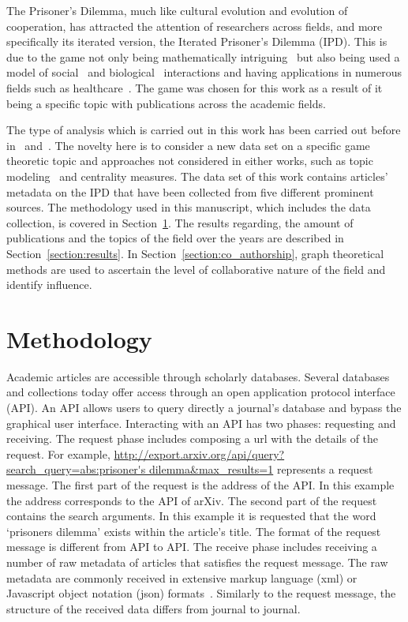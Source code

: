 \documentclass{article}
\theoremstyle{definition}
\newcommand{\totalarticles}{}
\begin{document}
The Prisoner's Dilemma, much like cultural evolution and evolution of cooperation,
has attracted the attention of researchers across fields, and more specifically
its iterated version, the Iterated Prisoner's Dilemma (IPD). This is due to
the game not only being mathematically
intriguing~\cite{Press2012} but also being used a model of
social~\cite{Zimmermann2005} and biological~\cite{Doebeli2005} interactions and
having applications in numerous fields such as healthcare~\cite{Turner1999}. The
game was chosen for this work as a result of it being a specific topic with
publications across the academic fields.

The type of analysis  which is carried out in this work has been carried out
before in~\cite{Liu2015} and~\cite{youngblood2018}. The novelty here is to
consider a new data set on a specific game theoretic topic and approaches not considered in
either works, such as topic modeling~\cite{Blei2003} and centrality measures.
The data set of this work contains \totalarticles
articles' metadata on the IPD that have been collected from five different
prominent sources. The methodology used in this manuscript, which includes the
data collection, is covered in Section~\ref{section:methodology}. The results regarding,
the amount of publications and the topics of the field over the years are
described in Section~\ref{section:results}. In
Section~\ref{section:co_authorship}, graph theoretical methods are used to
ascertain the level of collaborative nature of the field and identify influence.

\section{Methodology}\label{section:methodology}

Academic articles are accessible through scholarly databases. Several databases
and collections today offer access through an open application protocol
interface (API). An API allows users to query directly a journal's database and
bypass the graphical user interface. Interacting with an API has two phases:
requesting and receiving. The request phase includes composing a url with the
details of the request. For example,
\url{http://export.arxiv.org/api/query?search_query=abs:prisoner's
dilemma&max_results=1} represents a request message. The first part of the
request is the address of the API. In this example the address corresponds to
the API of arXiv. The second part of the request contains the search arguments.
In this example it is requested that the word `prisoners dilemma' exists within
the article's title. The format of the request message is different from API to
API. The receive phase includes receiving a number of raw metadata of articles
that satisfies the request message. The raw metadata are commonly received in
extensive markup language (xml) or Javascript object notation (json)
formats~\cite{nurseitov2009}. Similarly to the request message, the structure of
the received data differs from journal
to journal.
\end{document}

